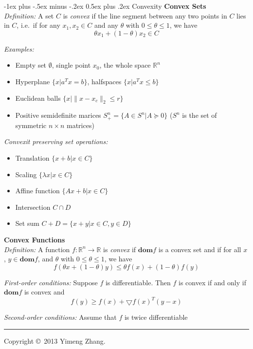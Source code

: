 \documentclass[10pt,landscape]{article}
\makeatletter
\renewcommand{\section}{\@startsection{section}{1}{0mm}%
                                {-1ex plus -.5ex minus -.2ex}%
                                {0.5ex plus .2ex}%
                                {\normalfont\large\bfseries}}
\makeatother
\begin{document}
\begin{multicols}{3}
\section{Convexity}
\textbf{Convex Sets} \\
\emph{Definition:} A set $C$ is \emph{convex} if the line segment between any two points in $C$ lies in $C$, i.e.\, if for any $x_1, x_2 \in C$ and any $\theta$ with $0 \leq \theta \leq 1$, we have \\
$$ \theta x_1 + (1 - \theta) x_2 \in C $$

\emph{Examples:}
\begin{itemize}
	\item Empty set $\emptyset$, single point ${x_0}$, the whole space $\mathbb{R}^n$
	\item Hyperplane $\{ x | a^T x = b \}$, halfspaces $\{ x | a^T x \leq b \}$
	\item Euclidean balls $\{ x | \| x - x_c \|_2 \leq r \}$
	\item Positive semidefinite marices $S_+^n = \{ A \in S^n | A \succeq 0 \}$ ($S^n$ is the set of symmetric $n \times n$ matrices)
\end{itemize}

\emph{Convexit preserving set operations:}
\begin{itemize}
	\item Translation $\{ x + b | x \in C \}$
	\item Scaling $\{ \lambda x | x \in C \}$
	\item Affine function $\{ Ax + b | x \in C\}$
	\item Intersection $C \cap D$
	\item Set sum $C + D = \{ x + y | x \in C, y \in D \}$
\end{itemize}

\textbf{Convex Functions} \\
\emph{Definition:} A function $f: \mathbb{R}^n \to \mathbb{R}$ is \emph{convex} if $\mathbf{dom} f$ is a convex set and if for all $x$, $y \in \mathbf{dom} f$, and $\theta$ with $0 \leq \theta \leq 1$, we have \\
$$ f(\theta x + (1 - \theta) y) \leq \theta f(x) + (1 - \theta) f(y) $$

\emph{First-order conditions:} Suppose $f$ is differentiable. Then $f$ is convex if and only if $\mathbf{dom} f$ is convex and
$$ f(y) \geq f(x) + \bigtriangledown f(x)^T (y-x) $$

\emph{Second-order conditions:} Assume that $f$ is twice differentiable

\rule{0.3\linewidth}{0.25pt}
\scriptsize

Copyright \copyright\ 2013 Yimeng Zhang.

\end{multicols}
\end{document}
